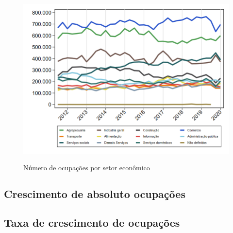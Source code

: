 \documentclass[10pt]{beamer}
\begin{document}
\begin{frame}
\textit{\hyperlink{indice_principal_amz_pa}{}}
\begin{figure}
  \centering
  \includegraphics[width=.85\linewidth]{./../analysis/output/_amz_pa_importancia_relativa.png}
  \label{_amz_pa_importancia_relativa}
  \caption{{Número de ocupações por setor econômico}}
\end{figure}
\end{frame}

\subsection{Crescimento de absoluto ocupações}

\begin{frame}
\textit{\hyperlink{indice_principal_amz_pa}{}}

\end{frame}

\begin{frame}
\textit{\hyperlink{indice_principal_amz_pa}{}}

\end{frame}

\begin{frame}
\textit{\hyperlink{indice_principal_amz_pa}{}}

\end{frame}

\subsection{Taxa de crescimento de ocupações}
\end{document}
